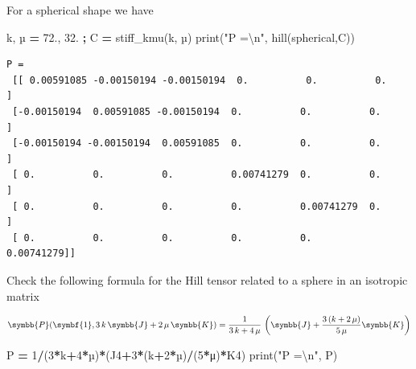 \documentclass[
  a4paper,
  numbers=noendperiod,
  DIV=12]{scrreprt}
\newenvironment{Shaded}{\begin{snugshade}}{\end{snugshade}}
\newcommand{\BuiltInTok}[1]{#1}
\newcommand{\CharTok}[1]{\textcolor[rgb]{0.31,0.60,0.02}{#1}}
\newcommand{\DecValTok}[1]{\textcolor[rgb]{0.00,0.00,0.81}{#1}}
\newcommand{\FloatTok}[1]{\textcolor[rgb]{0.00,0.00,0.81}{#1}}
\newcommand{\NormalTok}[1]{#1}
\newcommand{\OperatorTok}[1]{\textcolor[rgb]{0.81,0.36,0.00}{\textbf{#1}}}
\newcommand{\StringTok}[1]{\textcolor[rgb]{0.31,0.60,0.02}{#1}}
\newcommand{\uu}[1]{{\symbf{{#1}}}}
\newcommand{\uuuu}[1]{{\symbb{{#1}}}}
\begin{document}
\begin{tcolorbox}[enhanced jigsaw, arc=.35mm, bottomrule=.15mm, bottomtitle=1mm, breakable, colback=white, colbacktitle=quarto-callout-caution-color!10!white, colframe=quarto-callout-caution-color-frame, coltitle=black, left=2mm, leftrule=.75mm, opacityback=0, opacitybacktitle=0.6, rightrule=.15mm, title={Exercise}, titlerule=0mm, toprule=.15mm, toptitle=1mm]

For a spherical shape we have

\begin{Shaded}
\begin{Highlighting}[]
\NormalTok{k, µ }\OperatorTok{=} \FloatTok{72.}\NormalTok{, }\FloatTok{32.} \OperatorTok{;}\NormalTok{ C }\OperatorTok{=}\NormalTok{ stiff\_kmu(k, µ)}
\BuiltInTok{print}\NormalTok{(}\StringTok{"P =}\CharTok{\textbackslash{}n}\StringTok{"}\NormalTok{, hill(spherical,C))}
\end{Highlighting}
\end{Shaded}

\begin{verbatim}
P =
 [[ 0.00591085 -0.00150194 -0.00150194  0.          0.          0.        ]
 [-0.00150194  0.00591085 -0.00150194  0.          0.          0.        ]
 [-0.00150194 -0.00150194  0.00591085  0.          0.          0.        ]
 [ 0.          0.          0.          0.00741279  0.          0.        ]
 [ 0.          0.          0.          0.          0.00741279  0.        ]
 [ 0.          0.          0.          0.          0.          0.00741279]]
\end{verbatim}

Check the following formula for the Hill tensor related to a sphere in
an isotropic matrix

\[
\uuuu{P}(\uu{1},3\,k\,\uuuu{J}+2\,\mu\,\uuuu{K})=\frac{1}{3\,k+4\,\mu}\,\left(\uuuu{J}+\frac{3\,(k+2\,\mu)}{5\,\mu}\uuuu{K}\right)
\]

\begin{Shaded}
\begin{Highlighting}[]
\NormalTok{P }\OperatorTok{=} \DecValTok{1}\OperatorTok{/}\NormalTok{(}\DecValTok{3}\OperatorTok{*}\NormalTok{k}\OperatorTok{+}\DecValTok{4}\OperatorTok{*}\NormalTok{µ)}\OperatorTok{*}\NormalTok{(J4}\OperatorTok{+}\DecValTok{3}\OperatorTok{*}\NormalTok{(k}\OperatorTok{+}\DecValTok{2}\OperatorTok{*}\NormalTok{µ)}\OperatorTok{/}\NormalTok{(}\DecValTok{5}\OperatorTok{*}\NormalTok{μ)}\OperatorTok{*}\NormalTok{K4)}
\BuiltInTok{print}\NormalTok{(}\StringTok{"P =}\CharTok{\textbackslash{}n}\StringTok{"}\NormalTok{, P)}
\end{Highlighting}
\end{Shaded}


\end{tcolorbox}
\end{document}
